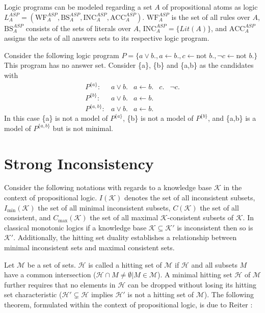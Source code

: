 Logic programs can be modeled regarding a set \(A\) of propositional atoms as logic \(L_A^{ASP} = (\text{WF}_A^{ASP}, \text{BS}_A^{ASP}, \text{INC}_A^{ASP}, \text{ACC}_A^{ASP})\). \(\text{WF}_A^{ASP}\) is the set of all rules over \(A\), \(\text{BS}_A^{ASP}\) consists of the sets of literals over \(A\), \(\text{INC}_A^{ASP} = \{Lit(A)\}\), and \(\text{ACC}_A^{ASP}\) assigns the sets of all answers sets to its respective logic program.

\begin{example}
    Consider the following logic program \(P = \{a \lor b., a \leftarrow b., c \leftarrow \text{not }b., \neg c \leftarrow \text{not }b.\}\) This program has no answer set. Consider \{a\}, \{b\} and \{a,b\} as the candidates with
    \[\begin{array}{rrrrr}
            P^{\{a\}}:   & a \lor b. & a \leftarrow b. & c. & \neg c. \\
            P^{\{b\}}:   & a \lor b. & a \leftarrow b.                \\
            P^{\{a,b\}}: & a \lor b. & a \leftarrow b.
        \end{array}\]
    In this case \{a\} is not a model of \(P^{\{a\}}\), \{b\} is not a model of \(P^{\{b\}}\), and \{a,b\} is a model of \(P^{\{a,b\}}\) but is not minimal.
    \label{ex:program}
\end{example}

\section{Strong Inconsistency}
Consider the following notations with regards to a knowledge base \(\mathcal{K}\) in the context of propositional logic. \(I(\mathcal{K})\) denotes the set of all inconsistent subsets, \(I_{\min}(\mathcal{K})\) the set of all minimal inconsistent subsets, \(C(\mathcal{K})\) the set of all consistent, and \(C_{\max}(\mathcal{K})\) the set of all maximal \(\mathcal{K}\)-consistent subsets of \(\mathcal{K}\). In classical monotonic logics if a knowledge base \(\mathcal{K} \subseteq \mathcal{K}'\) is inconsistent then so is \(\mathcal{K}'\). Additionally, the hitting set duality establishes a relationship between minimal inconsistent sets and maximal consistent sets.

Let \(\mathcal{M}\) be a set of sets. \(\mathcal{H}\) is called a hitting set of \(\mathcal{M}\) if \(\mathcal{H}\) and all subsets \(M\) have a common intersection (\(\mathcal{H} \cap M \neq \emptyset | M \in \mathcal{M}\)). A minimal hitting set \(\mathcal{H}\) of \(\mathcal{M}\) further requires that no elements in \(\mathcal{H}\) can be dropped without losing its hitting set characteristic (\(\mathcal{H}' \subsetneq \mathcal{H}\) implies \(\mathcal{H}'\) is not a hitting set of \(\mathcal{M}\)). The following theorem, formulated within the context of propositional logic, is due to Reiter \cite{reiter_theory_1987}:

